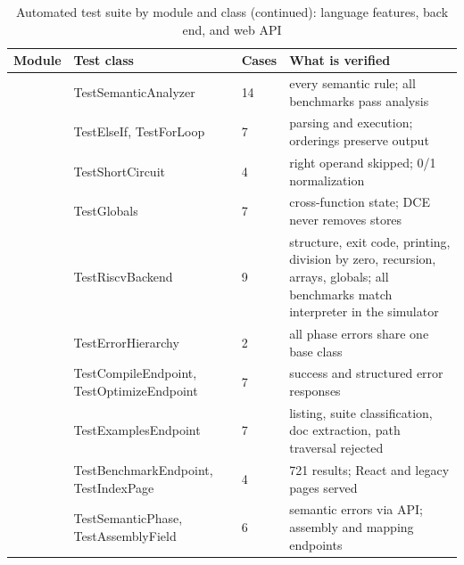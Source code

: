 \begin{table}[H]
\centering\scriptsize\renewcommand{\arraystretch}{1.0}
\caption{Automated test suite by module and class (continued): language features, back end, and web API}
\label{tab:tests2}
\begin{tabular}{L{2.4cm} L{5.0cm} C{0.9cm} L{5.0cm}}
\toprule
\textbf{Module} & \textbf{Test class} & \textbf{Cases} & \textbf{What is verified}\\
\midrule
{}
 & TestSemanticAnalyzer & 14 & every semantic rule; all benchmarks pass analysis\\
 & TestElseIf, TestForLoop & 7 & parsing and execution; orderings preserve output\\
 & TestShortCircuit & 4 & right operand skipped; 0/1 normalization\\
 & TestGlobals & 7 & cross-function state; DCE never removes stores\\
 & TestRiscvBackend & 9 & structure, exit code, printing, division by zero, recursion, arrays, globals; all benchmarks match interpreter in the simulator\\
 & TestErrorHierarchy & 2 & all phase errors share one base class\\
\midrule
{}
 & TestCompileEndpoint, TestOptimizeEndpoint & 7 & success and structured error responses\\
 & TestExamplesEndpoint & 7 & listing, suite classification, doc extraction, path traversal rejected\\
 & TestBenchmarkEndpoint, TestIndexPage & 4 & 721 results; React and legacy pages served\\
 & TestSemanticPhase, TestAssemblyField & 6 & semantic errors via API; assembly and mapping endpoints\\
\bottomrule
\end{tabular}
\end{table}
